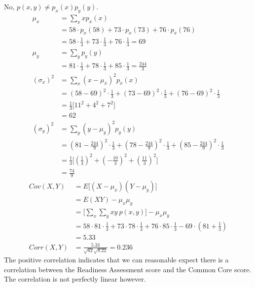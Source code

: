 \documentclass[letterpaper, 12pt]{math}
\begin{document}
No, \( p(x,y)\neq p_{x}(x)p_{y}(y) \).
\begin{align*}
  \mu_{x} &= \sum_{x}xp_{x}(x) \\
  &= 58\cdot p_{x}(58)+73\cdot p_{x}(73)+76\cdot p_{x}(76) \\
  &= 58\cdot\frac{1}{3}+73\cdot\frac{1}{3}+76\cdot\frac{1}{3} = 69 \\
  \mu_{y} &= \sum_{y}p_{y}(y) \\
  &= 81\cdot\frac{1}{3}+78\cdot\frac{1}{3}+85\cdot\frac{1}{3} = \frac{244}{3} \\
  (\sigma_{x})^{2} &= \sum_{x}(x-\mu_{x})^{2}p_{x}(x) \\
  &= (58-69)^{2}\cdot\frac{1}{3}+(73-69)^{2}\cdot\frac{1}{3}+
    (76-69)^{2}\cdot\frac{1}{3} \\
  &= \frac{1}{3}\big[11^{2}+4^{2}+7^{2}\big] \\
  &= 62 \\
  (\sigma_{y})^{2} &= \sum_{y}(y-\mu_{y})^{2}p_{y}(y) \\
  &= (81-\frac{244}{9})^{2}\cdot\frac{1}{3}+
    (78-\frac{244}{9})^{2}\cdot\frac{1}{3}+
    (85-\frac{244}{9})^{2}\cdot\frac{1}{3} \\
  &= \frac{1}{3}\big[
    (\frac{1}{3})^{2}+(-\frac{10}{3})^{2}+(\frac{11}{3})^{2}\big] \\
  &= \frac{74}{9}
\end{align*}
\begin{align*}
  Cov(X,Y) &= E\bigg[(X-\mu_{x})(Y-\mu_{y})\bigg] \\
  &= E(XY)-\mu_{x}\mu_{y} \\
  &= \bigg[\sum_{x}\sum_{y}xy\ p(x,y)\bigg]-\mu_{x}\mu_{y} \\
  &= 58\cdot81\cdot\frac{1}{3}+73\cdot78\cdot\frac{1}{3}+
    76\cdot85\cdot\frac{1}{3}-69\cdot(81+\frac{1}{3}) \\
  &= 5.33 \\
  Corr(X,Y) &= \frac{5.33}{\sqrt{62}\sqrt{8.22}} = 0.236
\end{align*}
The positive correlation indicates that we can reasonable expect there is a
correlation between the Readiness Assessment score and the Common Core score.
The correlation is not perfectly linear however.
\end{document}
